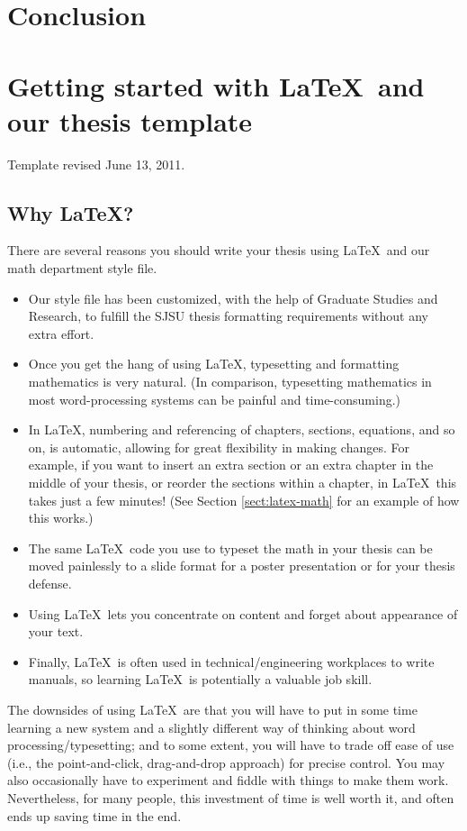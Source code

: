 \documentclass[modernstyle,12pt]{sjsuthesis}
\theoremstyle{definition}
\begin{document}
\chapter{Conclusion}

\chapter{Getting started with \LaTeX\ and our thesis template}

Template revised June 13, 2011.

\section{Why \LaTeX?}

There are several reasons you should write your thesis using \LaTeX\
and our math department style file.

\begin{itemize}
\item Our style file has been customized, with the help of Graduate
  Studies and Research, to fulfill the SJSU thesis formatting
  requirements without any extra effort.
\item Once you get the hang of using \LaTeX, typesetting and
  formatting mathematics is very natural.  (In comparison, typesetting
  mathematics in most word-processing systems can be painful and
  time-consuming.)
\item In \LaTeX, numbering and referencing of chapters, sections,
  equations, and so on, is automatic, allowing for great flexibility
  in making changes.  For example, if you want to insert an extra
  section or an extra chapter in the middle of your thesis, or reorder
  the sections within a chapter, in \LaTeX\ this takes just a few
  minutes!  (See Section \ref{sect:latex-math} for an example of how
  this works.)
\item The same \LaTeX\ code you use to typeset the math in your thesis
  can be moved painlessly to a slide format for a poster presentation
  or for your thesis defense.
\item Using \LaTeX\ lets you concentrate on content and forget about
  appearance of your text.
\item Finally, \LaTeX\ is often used in technical/engineering
  workplaces to write manuals, so learning \LaTeX\ is potentially a
  valuable job skill.
\end{itemize}

The downsides of using \LaTeX\ are that you will have to put in some
time learning a new system and a slightly different way of thinking
about word processing/typesetting; and to some extent, you will have
to trade off ease of use (i.e., the point-and-click, drag-and-drop
approach) for precise control.  You may also occasionally have to
experiment and fiddle with things to make them work.  Nevertheless,
for many people, this investment of time is well worth it, and often
ends up saving time in the end.
\end{document}
